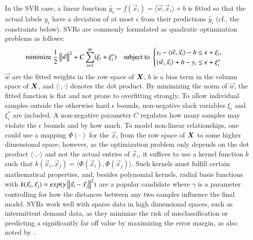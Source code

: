 In the SVR case, a linear function
    $\hat{y}_i = f(\vec{x}_i) = \langle\vec{w},\vec{x}_i\rangle + b$
    is fitted so that the actual labels $y_i$ have a deviation of at most
    $\epsilon$ from their predictions $\hat{y}_i$ (cf., the constraints
    below).
SVRs are commonly formulated as quadratic optimization problems as follows:
$$
\text{minimize }
\frac{1}{2} \left\lVert\vec{w}\right\rVert^2 + C \sum_{i=1}^m (\xi_i + \xi_i^*)
\quad \text{subject to }
\begin{cases}
y_i - \langle \vec{w}, \vec{x}_i \rangle - b \leq \epsilon + \xi_i
\text{,} \\
\langle \vec{w}, \vec{x}_i \rangle + b - y_i \leq \epsilon + \xi_i^*
\end{cases}
$$
$\vec{w}$ are the fitted weights in the row space of $\bm{X}$, $b$ is a bias
    term in the column space of $\bm{X}$, and $\langle\cdot,\cdot\rangle$
    denotes the dot product.
By minimizing the norm of $\vec{w}$, the fitted function is flat and not prone
    to overfitting strongly.
To allow individual samples outside the otherwise hard $\epsilon$ bounds,
    non-negative slack variables $\xi_i$ and $\xi_i^*$ are included.
A non-negative parameter $C$ regulates how many samples may violate the
    $\epsilon$ bounds and by how much.
To model non-linear relationships, one could use a mapping $\Phi(\cdot)$ for
    the $\vec{x}_i$ from the row space of $\bm{X}$ to some higher
    dimensional space; however, as the optimization problem only depends on
    the dot product $\langle\cdot,\cdot\rangle$ and not the actual entries of
    $\vec{x}_i$, it suffices to use a kernel function $k$ such that
    $k(\vec{x}_i,\vec{x}_j) = \langle\Phi(\vec{x}_i),\Phi(\vec{x}_j)\rangle$.
Such kernels must fulfill certain mathematical properties, and, besides
    polynomial kernels, radial basis functions with 
    $k(\vec{x}_i,\vec{x}_j) = exp(\gamma \left\lVert\vec{x}_i - \vec{x}_j\right\rVert^2)$ are
    a popular candidate where $\gamma$ is a parameter controlling for how the
    distances between any two samples influence the final model.
SVRs work well with sparse data in high dimensional spaces, such as
    intermittent demand data, as they minimize the risk of misclassification
    or predicting a significantly far off value by maximizing the error
    margin, as also noted by \cite{bao2004}.
